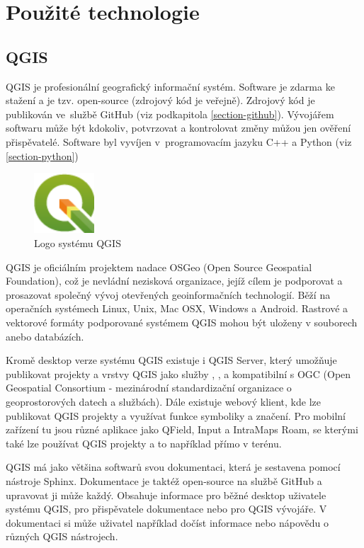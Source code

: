 \chapter{Použité technologie}
\label{4-technologie}

\section{QGIS}

QGIS je profesionální geografický informační systém.
Software je zdarma ke stažení a je tzv. open-source (zdrojový kód je veřejně).
Zdrojový kód je publikován ve~službě GitHub (viz podkapitola \ref{section-github}).
Vývojářem softwaru může být kdokoliv, potvrzovat a kontrolovat změny můžou jen ověření
přispěvatelé. Software byl vyvíjen v~programovacím jazyku C++ a Python (viz \ref{section-python})

\begin{figure}[H] \centering
    \includegraphics[width=64pt]{./pictures/qgis-logo.png}
    \caption[Logo systému QGIS]{Logo systému QGIS \cite{qgis}}
	\label{fig:qgis-logo}                                
\end{figure}

QGIS je oficiálním projektem nadace OSGeo (Open Source Geospatial Foundation), což je nevládní 
nezisková organizace, jejíž cílem je podporovat a prosazovat společný vývoj otevřených geoinformačních
technologií. Běží na operačních systémech Linux, Unix, Mac OSX, Windows a Android.
Rastrové a vektorové formáty podporované systémem QGIS mohou být uloženy v souborech anebo databázích.


Kromě desktop verze systému QGIS existuje i QGIS Server, který umožňuje publikovat projekty a vrstvy
QGIS jako služby , ,  a  kompatibilní s OGC (Open Geospatial Consortium - mezinárodní standardizační organizace
o geoprostorových datech a službách). Dále existuje webový klient, kde lze publikovat
QGIS projekty a využívat funkce symboliky a značení. Pro mobilní zařízení tu jsou
různé aplikace jako QField, Input a IntraMaps Roam, se kterými také lze používat QGIS projekty a to 
například přímo v terénu. 


QGIS má jako většina softwarů svou dokumentaci, která je sestavena pomocí nástroje Sphinx. 
Dokumentace je taktéž open-source na službě GitHub a upravovat ji může každý. Obsahuje
informace pro běžné desktop uživatele systému QGIS, pro přispěvatele dokumentace nebo pro QGIS
vývojáře. V dokumentaci si může uživatel například dočíst informace nebo nápovědu o různých
QGIS nástrojech.

